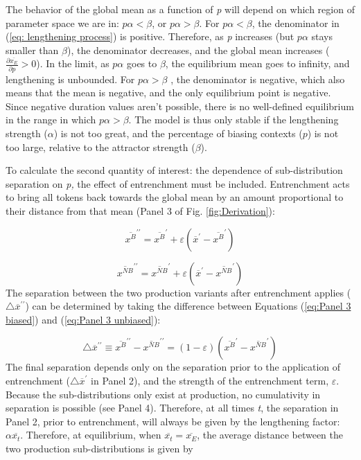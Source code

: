 The behavior of the global mean as a function of \emph{p} will depend
on which region of parameter space we are in: $p\alpha<\beta$, or
$p\alpha>\beta$. For $p\alpha<\beta$, the denominator in (\ref{eq: lengthening process})
is positive. Therefore, as \emph{p} increases (but $p\alpha$ stays
smaller than $\beta$), the denominator decreases, and the global
mean increases ($\frac{\partial\overline{x_{E}}}{\partial p}>0$).
In the limit, as $p\alpha$ goes to $\beta$, the equilibrium mean
goes to infinity, and lengthening is unbounded. For $p\alpha>\beta$
, the denominator is negative, which also means that the mean is negative,
and the only equilibrium point is negative. Since negative duration
values aren't possible, there is no well-defined equilibrium in the
range in which $p\alpha>\beta$. The  model is thus
only stable if the lengthening strength ($\alpha$) is not too great,
and the percentage of biasing contexts ($p$) is not too large, relative
to the attractor strength ($\beta$).

To calculate the second quantity of interest: the dependence of sub-distribution
separation on \emph{p,} the effect of entrenchment must be included.
Entrenchment acts to bring all tokens back towards the global mean
by an amount proportional to their distance from that mean (Panel
3 of Fig. \ref{fig:Derivation}): 

\begin{equation}
\overline{x^{B}}^{\prime\prime}=\overline{x^{B}}^{\prime}+\varepsilon(\overline{x}^{\prime}-\overline{x^{B}}^{\prime})\label{eq:Panel 3 biased}
\end{equation}

\begin{equation}
\overline{x^{NB}}^{\prime\prime}=\overline{x^{NB}}^{\prime}+\varepsilon(\overline{x}^{\prime}-\overline{x^{NB}}^{\prime})\label{eq:Panel 3 unbiased}
\end{equation}
The separation between the two production variants after entrenchment
applies ($\triangle\overline{x}^{\prime\prime}$) can be determined
by taking the difference between Equations (\ref{eq:Panel 3 biased})
and (\ref{eq:Panel 3 unbiased}): 

\begin{equation}
\triangle\overline{x}^{\prime\prime}\equiv\overline{x^{B}}^{\prime\prime}-\overline{x^{NB}}^{\prime\prime}=(1-\varepsilon)(\overline{x^{B}}^{\prime}-\overline{x^{NB}}^{\prime})
\end{equation}
The final separation depends only on the separation prior to the application
of entrenchment ($\triangle\overline{x}^{\prime}$ in Panel 2), and
the strength of the entrenchment term, $\varepsilon$. Because the
sub-distributions only exist at production, no cumulativity in separation
is possible (see Panel 4). Therefore, at all times \emph{t}, the separation
in Panel 2, prior to entrenchment, will always be given by the lengthening
factor: $\alpha\overline{x_{t}}$. Therefore, at equilibrium, when
$\overline{x_{t}}=\overline{x_{E}}$, the average distance between
the two production sub-distributions is given by


